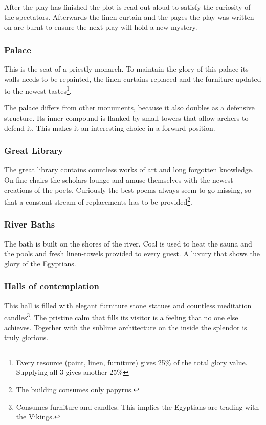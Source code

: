 \documentclass[a4paper]{book}
\begin{document}
			After the play has finished the plot is read out aloud to satisfy the curiosity
			of the spectators.
			Afterwards the linen curtain and the pages the play was written on are burnt
			to ensure the next play will hold a new mystery.

		\subsubsection{Palace}
			This is the seat of a priestly monarch.
			To maintain the glory of this palace its walls needs to be repainted,
			the linen curtains replaced and the furniture updated to the newest tastes\footnote{
				Every resource (paint, linen, furniture) gives 25\% of the total glory value.
				Supplying all 3 gives another 25\%
			}.

			The palace differs from other monuments, because it also doubles as a defensive
			structure.
			Its inner compound is flanked by small towers that allow archers to defend it.
			This makes it an interesting choice in a forward position.

		\subsubsection{Great Library}
			The great library contains countless works of art and long forgotten knowledge.
			On fine chairs the scholars lounge and amuse themselves with the newest creations
			of the poets.
			Curiously the best poems always seem to go missing, so that a constant stream
			of replacements has to be provided\footnote{
				The building consumes only papyrus.
			}.

		\subsubsection{River Baths}
			The bath is built on the shores of the river.
			Coal is used to heat the sauna and the pools and fresh linen-towels
			provided to every guest.
			A luxury that shows the glory of the \gls{Egyptians}.

		\subsubsection{Halls of contemplation}
			This hall is filled with elegant furniture stone statues and countless meditation
			candles\footnote{
				Consumes furniture and candles.
				This implies the \gls{Egyptians} are trading with the \gls{Vikings}.
			}.
			The pristine calm that fills its visitor is a feeling that no one else achieves.
			Together with the sublime architecture on the inside the splendor is truly glorious.
\end{document}
